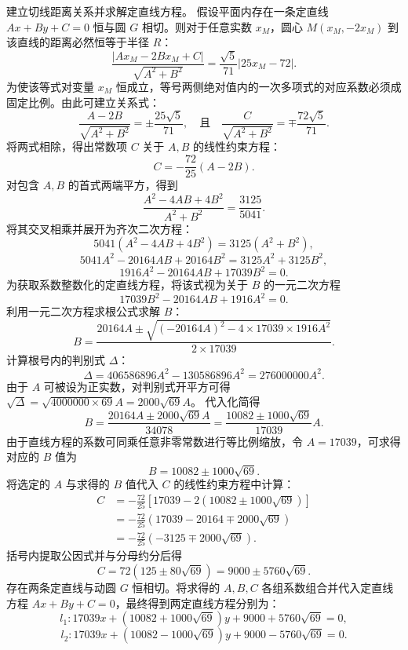 \begin{solution}
建立切线距离关系并求解定直线方程。
假设平面内存在一条定直线 $Ax + By + C = 0$ 恒与圆 $G$ 相切。则对于任意实数 $x_M$，圆心 $M(x_M, -2x_M)$ 到该直线的距离必然恒等于半径 $R$：
\[ \frac{|Ax_M - 2Bx_M + C|}{\sqrt{A^2 + B^2}} = \frac{\sqrt{5}}{71} |25x_M - 72|. \]
为使该等式对变量 $x_M$ 恒成立，等号两侧绝对值内的一次多项式的对应系数必须成固定比例。由此可建立关系式：
\[ \frac{A - 2B}{\sqrt{A^2 + B^2}} = \pm \frac{25\sqrt{5}}{71}, \quad \text{且} \quad \frac{C}{\sqrt{A^2 + B^2}} = \mp \frac{72\sqrt{5}}{71}. \]
将两式相除，得出常数项 $C$ 关于 $A, B$ 的线性约束方程：
\[ C = -\frac{72}{25}(A - 2B). \]
对包含 $A, B$ 的首式两端平方，得到
\[ \frac{A^2 - 4AB + 4B^2}{A^2 + B^2} = \frac{3125}{5041}. \]
将其交叉相乘并展开为齐次二次方程：
\[ 5041(A^2 - 4AB + 4B^2) = 3125(A^2 + B^2), \]
\[ 5041A^2 - 20164AB + 20164B^2 = 3125A^2 + 3125B^2, \]
\[ 1916A^2 - 20164AB + 17039B^2 = 0. \]
为获取系数整数化的定直线方程，将该式视为关于 $B$ 的一元二次方程
\[ 17039B^2 - 20164AB + 1916A^2 = 0. \]
利用一元二次方程求根公式求解 $B$：
\[ B = \frac{20164A \pm \sqrt{(-20164A)^2 - 4 \times 17039 \times 1916A^2}}{2 \times 17039}. \]
计算根号内的判别式 $\Delta$：
\[ \Delta = 406586896A^2 - 130586896A^2 = 276000000A^2. \]
由于 $A$ 可被设为正实数，对判别式开平方可得 $\sqrt{\Delta} = \sqrt{4000000 \times 69}A = 2000\sqrt{69}A$。
代入化简得
\[ B = \frac{20164A \pm 2000\sqrt{69}A}{34078} = \frac{10082 \pm 1000\sqrt{69}}{17039}A. \]
由于直线方程的系数可同乘任意非零常数进行等比例缩放，令 $A = 17039$，可求得对应的 $B$ 值为
\[ B = 10082 \pm 1000\sqrt{69}. \]
将选定的 $A$ 与求得的 $B$ 值代入 $C$ 的线性约束方程中计算：
\begin{align*}
C &= -\frac{72}{25}\left[ 17039 - 2(10082 \pm 1000\sqrt{69}) \right] \\
&= -\frac{72}{25} (17039 - 20164 \mp 2000\sqrt{69}) \\
&= -\frac{72}{25} (-3125 \mp 2000\sqrt{69}).
\end{align*}
括号内提取公因式并与分母约分后得
\[ C = 72(125 \pm 80\sqrt{69}) = 9000 \pm 5760\sqrt{69}. \]
存在两条定直线与动圆 $G$ 恒相切。将求得的 $A, B, C$ 各组系数组合并代入定直线方程 $Ax + By + C = 0$，最终得到两定直线方程分别为：
\[ l_1: 17039x + (10082 + 1000\sqrt{69})y + 9000 + 5760\sqrt{69} = 0, \]
\[ l_2: 17039x + (10082 - 1000\sqrt{69})y + 9000 - 5760\sqrt{69} = 0. \]

\end{solution}


